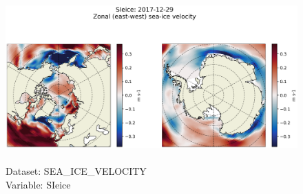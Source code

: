 \begin{figure}[H]
\centering
\includegraphics[scale=0.5]{../images/plots/latlon_plots/Sea-Ice_Velocity/SIeice.png}
\caption{\\Dataset: SEA\_ICE\_VELOCITY\\Variable: SIeice}
\label{tab:table-SEA_ICE_VELOCITY_SIeice-Plot}
\end{figure}
\pagebreak
